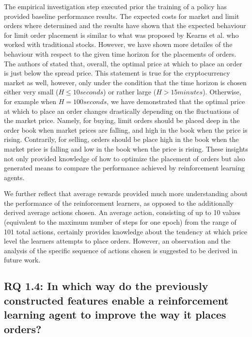     The empirical investigation step executed prior the training of a policy has provided baseline performance results.
    The expected costs for market and limit orders where determined and the results have shown that the expected behaviour for limit order placement is similar to what was proposed by Kearns et al. \cite{nevmyvaka2005electronic} who worked with traditional stocks.
    However, we have shown more detailes of the behaviour with respect to the given time horizon for the placements of orders.
    The authors of \cite{nevmyvaka2005electronic} stated that, overall, the optimal price at which to place an order is just below the spread price.
    This statement is true for the cryptocurrency market as well, however, only under the condition that the time horizon is chosen either very small ($H\leq10 seconds$) or rather large ($H>15 minutes$).
    Otherwise, for example when $H=100 seconds$, we have demonstrated that the optimal price at which to place an order changes drastically depending on the fluctuations of the market price.
    Namely, for buying, limit orders should be placed deep in the order book when market prices are falling, and high in the book when the price is rising.
    Contrarily, for selling, orders should be place high in the book when the market price is falling and low in the book when the price is rising.
    These insights not only provided knowledge of how to optimize the placement of orders but also generated means to compare the performance achieved by reinforcement learning agents.
    
    We further reflect that average rewards provided much more understanding about the performance of the reinforcement learners, as opposed to the additionally derived average actions chosen.
    An average action, consisting of up to 10 values (equivalent to the maximum number of steps for one epoch) from the range of 101 total actions, certainly provides knowledge about the tendency at which price level the learners attempts to place orders.
    However, an observation and the analysis of the specific sequence of actions chosen is suggested to be derived in future work.
    
\subsection{RQ 1.4: In which way do the previously constructed features enable a reinforcement learning agent to improve the way it places orders?}

